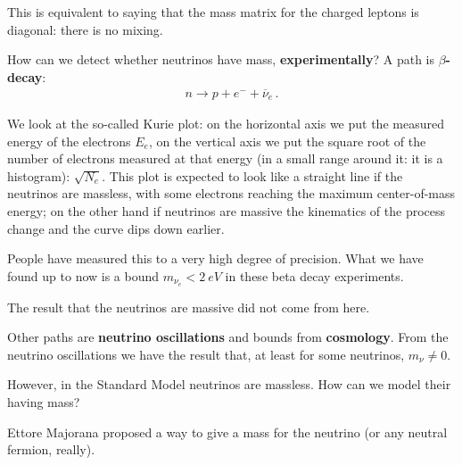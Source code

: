 \documentclass[main.tex]{subfiles}
\begin{document}
This is equivalent to saying that the mass matrix for the charged leptons is diagonal: there is no mixing.

How can we detect whether neutrinos have mass, \textbf{experimentally}? 
A path is \textbf{\(\beta \)-decay}: 
\begin{align}
n \to p + e^{-} + \overline{\nu}_{e}
\,.
\end{align}

We look at the so-called Kurie plot: on the horizontal axis we put the measured energy of the electrons \(E_e\), on the vertical axis we put the square root of the number of electrons measured at that energy (in a small range around it: it is a histogram): \(\sqrt{N_e}\). 
This plot is expected to look like a straight line if the neutrinos are massless, with some electrons reaching the maximum center-of-mass energy; on the other hand if neutrinos are massive the kinematics of the process change and the curve dips down earlier.

People have measured this to a very high degree of precision.
What we have found up to now is a bound \(m_{\nu_{e}} < \SI{2}{eV}\) in these beta decay experiments. 

The result that the neutrinos are massive did not come from here. 

Other paths are \textbf{neutrino oscillations} and bounds from \textbf{cosmology}. 
From the neutrino oscillations we have the result that, at least for some neutrinos, \(m_{\nu } \neq 0\).

However, in the Standard Model neutrinos are massless. How can we model their having mass?

Ettore Majorana proposed a way to give a mass for the neutrino (or any neutral fermion, really).



\end{document}
